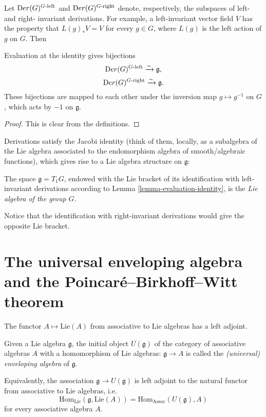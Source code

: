 Let ${\text Der}(G)^{G\text{-left}}$ and ${\text Der}(G)^{G\text{-right}}$ denote, respectively, the subspaces of left- and right- invariant derivations. For example, a left-invariant vector field $V$ has the property that $L(g)_* V = V$ for every $g\in G$, where $L(g)$ is the left action of $g$ on $G$. Then
\begin{lemma}
 \label{lemma-evaluation-identity}
 Evaluation at the identity gives bijections
 $$ {\text Der}(G)^{G\text{-left}} \xrightarrow\sim \mathfrak g,$$ 
 $${\text Der}(G)^{G\text{-right}} \xrightarrow\sim\mathfrak g.$$
These bijections are mapped to each other under the inversion map $g\mapsto g^{-1}$ on $G$, which acts by $-1$ on $\mathfrak g$.
\end{lemma}

\begin{proof}
 This is clear from the definitions.
\end{proof}

Derivations satisfy the Jacobi identity (think of them, locally, as a subalgebra of the Lie algebra associated to the endomorphism algebra of smooth/algebraic functions), which gives rise to a Lie algebra structure on $\mathfrak g$:

\begin{definition}
\label{definition-Liealgebra-ofgroup}
 The space $\mathfrak g= T_1 G$, endowed with the Lie bracket of its identification with left- invariant derivations according to Lemma \ref{lemma-evaluation-identity}, is the {\it Lie algebra of the group $G$}.
\end{definition}

Notice that the identification with right-invariant derivations would give the opposite Lie bracket. 


\section{The universal enveloping algebra and the Poincar\'e--Birkhoff--Witt theorem}
\label{section-enveloping}

The functor $A\mapsto \text{Lie}(A)$ from associative to Lie algebras has a left adjoint.

\begin{definition}
 \label{definition-universal-enveloping-algebra}
Given a Lie algebra $\mathfrak g$, the initial object $U(\mathfrak g)$ of the category of associative algebras $A$ with a homomorphism of Lie algebras: $\mathfrak g\to A$ is called the {\it (universal) enveloping algebra} of $\mathfrak g$. 

Equivalently, the association $\mathfrak g\to U(\mathfrak g)$ is left adjoint to the natural functor from associative to Lie algebras, i.e. 
$$\text{Hom}_{\text{Lie}} (\mathfrak g, \text{Lie}(A)) = \text{Hom}_{\text{Assoc}} (U(\mathfrak g), A)$$
for every associative algebra $A$.
\end{definition}

